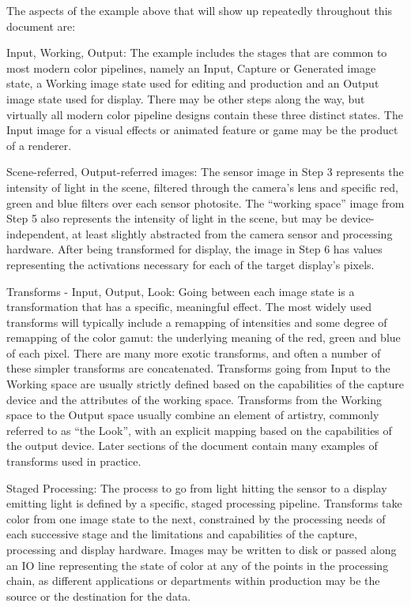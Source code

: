 The aspects of the example above that will show up repeatedly throughout this document are:

Input, Working, Output: The example includes the stages that are common to most modern color pipelines, namely an Input, Capture or Generated image state, a Working image state used for editing and production and an Output image state used for display. There may be other steps along the way, but virtually all modern color pipeline designs contain these three distinct states. The Input image for a visual effects or animated feature or game may be the product of a renderer.

Scene-referred, Output-referred images: The sensor image in Step 3 represents the intensity of light in the scene, filtered through the camera’s lens and specific red, green and blue filters over each sensor photosite. The “working space” image from Step 5 also represents the intensity of light in the scene, but may be device-independent, at least slightly abstracted from the camera sensor and processing hardware. After being transformed for display, the image in Step 6 has values representing the activations necessary for each of the target display’s pixels.

Transforms - Input, Output, Look: Going between each image state is a transformation that has a specific, meaningful effect. The most widely used transforms will typically include a remapping of intensities and some degree of remapping of the color gamut: the underlying meaning of the red, green and blue of each pixel. There are many more exotic transforms, and often a number of these simpler transforms are concatenated. Transforms going from Input to the Working space are usually strictly defined based on the capabilities of the capture device and the attributes of the working space. Transforms from the Working space to the Output space usually combine an element of artistry, commonly referred to as “the Look”, with an explicit mapping based on the capabilities of the output device. Later sections of the document contain many examples of transforms used in practice.

Staged Processing: The process to go from light hitting the sensor to a display emitting light is defined by a specific, staged processing pipeline. Transforms take color from one image state to the next, constrained by the processing needs of each successive stage and the limitations and capabilities of the capture, processing and display hardware. Images may be written to disk or passed along an IO line representing the state of color at any of the points in the processing chain, as different applications or departments within production may be the source or the destination for the data. 

